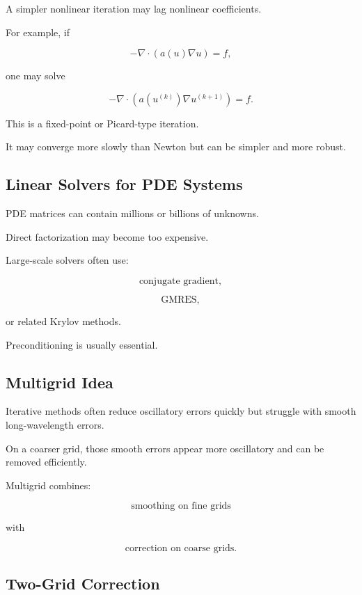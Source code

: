 A simpler nonlinear iteration may lag nonlinear coefficients.

For example, if

\[
-\nabla\cdot
(
a(u)\nabla u
)
=
f,
\]

one may solve

\[
\boxed{
-\nabla\cdot
(
a(u^{(k)})\nabla u^{(k+1)}
)
=
f.
}
\]

This is a fixed-point or Picard-type iteration.

It may converge more slowly than Newton but can be simpler and more
robust.

\subsection{Linear Solvers for PDE Systems}
\label{subsec:pde-linear-solvers}

PDE matrices can contain millions or billions of unknowns.

Direct factorization may become too expensive.

Large-scale solvers often use:

\[
\boxed{
\text{conjugate gradient},
}
\]

\[
\boxed{
\text{GMRES},
}
\]

or related Krylov methods.

Preconditioning is usually essential.

\subsection{Multigrid Idea}
\label{subsec:multigrid}

Iterative methods often reduce oscillatory errors quickly but struggle with
smooth long-wavelength errors.

On a coarser grid, those smooth errors appear more oscillatory and can be
removed efficiently.

Multigrid combines:

\[
\boxed{
\text{smoothing on fine grids}
}
\]

with

\[
\boxed{
\text{correction on coarse grids}.
}
\]

\subsection{Two-Grid Correction}
\label{subsec:two-grid-correction}

